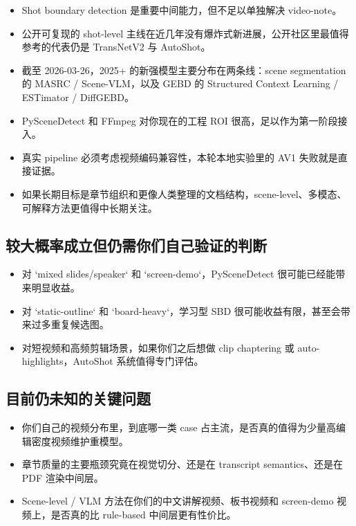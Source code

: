 \documentclass[a4paper]{article}
\begin{document}
\begin{itemize}
\item Shot boundary detection 是重要中间能力，但不足以单独解决 video-note。
\item 公开可复现的 shot-level 主线在近几年没有爆炸式新进展，公开社区里最值得参考的代表仍是 TransNetV2 与 AutoShot。
\item 截至 2026-03-26，2025+ 的新强模型主要分布在两条线：scene segmentation 的 MASRC / Scene-VLM，以及 GEBD 的 Structured Context Learning / ESTimator / DiffGEBD。
\item PySceneDetect 和 FFmpeg 对你现在的工程 ROI 很高，足以作为第一阶段接入。
\item 真实 pipeline 必须考虑视频编码兼容性，本轮本地实验里的 AV1 失败就是直接证据。
\item 如果长期目标是章节组织和更像人类整理的文档结构，scene-level、多模态、可解释方法更值得中长期关注。
\end{itemize}

\subsection{较大概率成立但仍需你们自己验证的判断}

\begin{itemize}
\item 对 `mixed slides/speaker` 和 `screen-demo`，PySceneDetect 很可能已经能带来明显收益。
\item 对 `static-outline` 和 `board-heavy`，学习型 SBD 很可能收益有限，甚至会带来过多重复候选图。
\item 对短视频和高频剪辑场景，如果你们之后想做 clip chaptering 或 auto-highlights，AutoShot 系统值得专门评估。
\end{itemize}

\subsection{目前仍未知的关键问题}

\begin{itemize}
\item 你们自己的视频分布里，到底哪一类 case 占主流，是否真的值得为少量高编辑密度视频维护重模型。
\item 章节质量的主要瓶颈究竟在视觉切分、还是在 transcript semantics、还是在 PDF 渲染中间层。
\item Scene-level / VLM 方法在你们的中文讲解视频、板书视频和 screen-demo 视频上，是否真的比 rule-based 中间层更有性价比。
\end{itemize}
\end{document}
